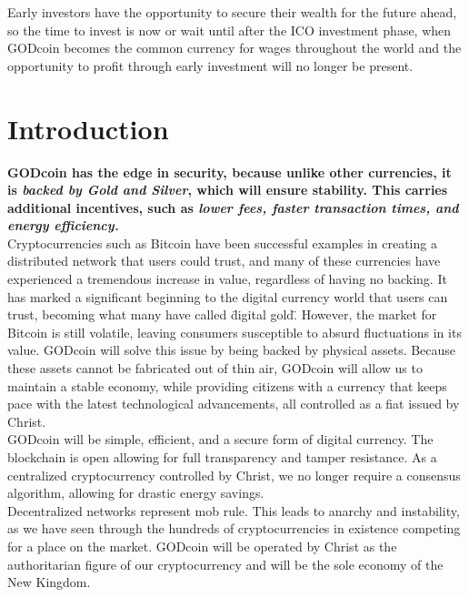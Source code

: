 \documentclass[12pt,a4paper]{article}
\begin{document}
  Early investors have the opportunity to secure their wealth for the future
  ahead, so the time to invest is now or wait until after the ICO investment
  phase, when GODcoin becomes the common currency for wages throughout the world
  and the opportunity to profit through early investment will no longer be
  present.

  \newpage
  \tableofcontents
  \newpage

  \section{Introduction}
  \textbf{GODcoin has the edge in security, because unlike other currencies, it
  is \textit{backed by Gold and Silver}, which will ensure stability. This
  carries additional incentives, such as \textit{lower fees, faster transaction
  times, and energy efficiency.}}\\

  Cryptocurrencies such as Bitcoin have been successful examples in
  creating a distributed network that users could trust, and many of these
  currencies have experienced a tremendous increase in value, regardless of
  having no backing. It has marked a significant beginning to the digital
  currency world that users can trust, becoming what many have called \"digital
  gold\". However, the market for Bitcoin is still volatile, leaving
  consumers susceptible to absurd fluctuations in its value. GODcoin will solve
  this issue by being backed by physical assets. Because these assets cannot be
  fabricated out of thin air, GODcoin will allow us to maintain a stable
  economy, while providing citizens with a currency that keeps pace with the
  latest technological advancements, all controlled as a fiat issued by
  Christ.\\

  GODcoin will be simple, efficient, and a secure form of digital currency. The
  blockchain is open allowing for full transparency and tamper resistance. As a
  centralized cryptocurrency controlled by Christ, we no longer require a
  consensus algorithm, allowing for drastic energy savings.\\

  Decentralized networks represent mob rule. This leads to anarchy and
  instability, as we have seen through the hundreds of cryptocurrencies in
  existence competing for a place on the market. GODcoin will be operated by
  Christ as the authoritarian figure of our cryptocurrency and will be the sole
  economy of the New Kingdom.\\
\end{document}
